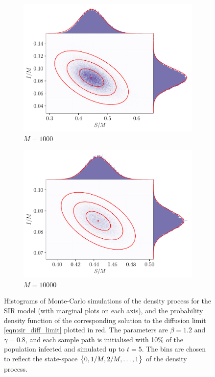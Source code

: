 \begin{figure}
\begin{center}
\begin{subfigure}{0.49\textwidth}
			\includegraphics[width=\textwidth]{chp07_outlook/figures/sir/sir_pairwise_1000}
			\caption{\(M = 1000\)}
			\label{fig:sir_gauss_rels_3}
		\end{subfigure}\begin{subfigure}{0.49\textwidth}
			\includegraphics[width=\textwidth]{chp07_outlook/figures/sir/sir_pairwise_10000}
			\caption{\(M = 10000\)}
			\label{fig:sir_gauss_rels_4}
		\end{subfigure}
		\caption{Histograms of Monte-Carlo simulations of the density process for the SIR model (with marginal plots on each axis), and the probability density function of the corresponding solution to the diffusion limit \cref{eqn:sir_diff_limit} plotted in red.
			The parameters are \(\beta = 1.2\) and \(\gamma = 0.8\), and each sample path is initialised with 10\% of the population infected and simulated up to \(t = 5\).
			The bins are chosen to reflect the state-space \(\set{0, 1/M, 2/M, \dotsc, 1}\) of the density process.}
		\label{fig:sir_gauss_rels}
	\end{center}
\end{figure}

